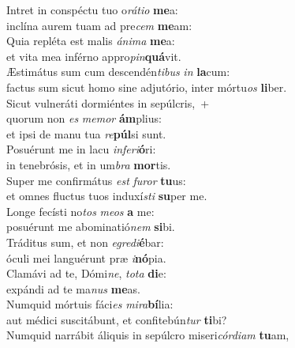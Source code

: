 \evenverse Intret in conspéctu tuo o\textit{rá}\textit{ti}\textit{o} \textbf{me}a:~\*\\
\evenverse inclína aurem tuam ad pre\textit{cem} \textbf{me}am:\\
\oddverse Quia repléta est malis \textit{á}\textit{ni}\textit{ma} \textbf{me}a:~\*\\
\oddverse et vita mea inférno appro\textit{pin}\textbf{quá}vit.\\
\evenverse Æstimátus sum cum descendén\textit{ti}\textit{bus} \textit{in} \textbf{la}cum:~\*\\
\evenverse factus sum sicut homo sine adjutório, inter mórtu\textit{os} \textbf{li}ber.\\
\oddverse Sicut vulneráti dormiéntes in sepúlcris,~+\\
\oddverse  quorum non \textit{es} \textit{me}\textit{mor} \textbf{ám}plius:~\*\\
\oddverse et ipsi de manu tua \textit{re}\textbf{púl}si sunt.\\
\evenverse Posuérunt me in lacu \textit{in}\textit{fe}\textit{ri}\textbf{ó}ri:~\*\\
\evenverse in tenebrósis, et in um\textit{bra} \textbf{mor}tis.\\
\oddverse Super me confirmátus \textit{est} \textit{fu}\textit{ror} \textbf{tu}us:~\*\\
\oddverse et omnes fluctus tuos induxí\textit{sti} \textbf{su}per me.\\
\evenverse Longe fecísti no\textit{tos} \textit{me}\textit{os} \textbf{a} me:~\*\\
\evenverse posuérunt me abominatió\textit{nem} \textbf{si}bi.\\
\oddverse Tráditus sum, et non \textit{e}\textit{gre}\textit{di}\textbf{é}bar:~\*\\
\oddverse óculi mei languérunt præ \textit{i}\textbf{nó}pia.\\
\evenverse Clamávi ad te, Dómi\textit{ne}, \textit{to}\textit{ta} \textbf{di}e:~\*\\
\evenverse expándi ad te ma\textit{nus} \textbf{me}as.\\
\oddverse Numquid mórtuis fáci\textit{es} \textit{mi}\textit{ra}\textbf{bí}lia:~\*\\
\oddverse aut médici suscitábunt, et confitebún\textit{tur} \textbf{ti}bi?\\
\evenverse Numquid narrábit áliquis in sepúlcro miseri\textit{cór}\textit{di}\textit{am} \textbf{tu}am,~\*\\
